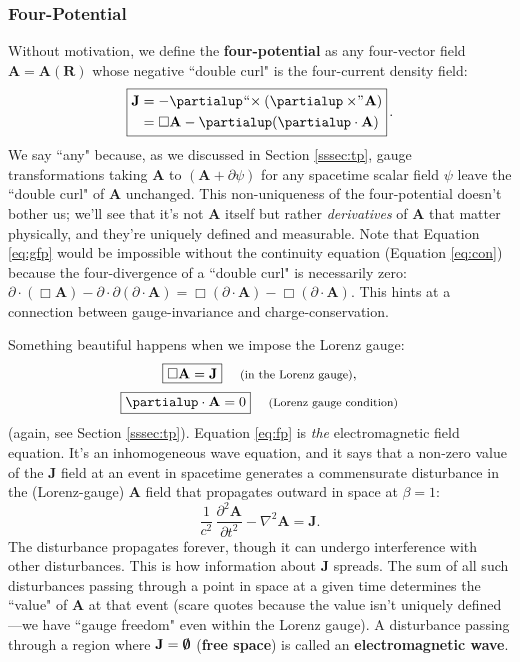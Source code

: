\documentclass[12pt]{article}
\renewcommand{\vv}[1]{\mathbf{#1}}
\begin{document}
\subsubsection{Four-Potential}\label{sssec:fp}

Without motivation, we define the \textbf{four-potential} as any four-vector field $\vv A = \vv A (\vv R)$ whose negative ``double curl" is the four-current density field:
\begin{equation}\label{eq:gfp}
\boxed{
\begin{split}
\vv J &= - \partialup \mkern1mu `` \mkern-4mu \times ( \partialup \times \mkern-4mu " \mkern1mu \vv A ) \\
&= \Box \vv A - \partialup ( \partialup \cdot \vv A)
\end{split}
} \, .
\end{equation}
We say ``any" because, as we discussed in Section \ref{sssec:tp}, gauge transformations taking $\vv A$ to $(\vv A + \partialup \psi)$ for any spacetime scalar field $\psi$ leave the ``double curl" of $\vv A$ unchanged. This non-uniqueness of the four-potential doesn't bother us; we'll see that it's not $\vv A$ itself but rather \emph{derivatives} of $\vv A$ that matter physically, and they're uniquely defined and measurable. Note that Equation \ref{eq:gfp} would be impossible without the continuity equation (Equation \ref{eq:con}) because the four-divergence of a ``double curl" is necessarily zero: ${\partialup \cdot (\Box \vv A) - \partialup \cdot \partialup (\partialup \cdot \vv A) = \Box (\partialup \cdot \vv A) - \Box (\partialup \cdot \vv A)}$. This hints at a connection between gauge-invariance and charge-conservation.

Something beautiful happens when we impose the Lorenz gauge:
\begin{equation}\label{eq:fp}
\boxed{ \Box \vv A = \vv J } \quad \textrm{\footnotesize{ (in the Lorenz gauge)}} ,
\end{equation}
\begin{equation}\label{eq:lg}
\boxed{ \partialup \cdot \vv A = 0 } \quad \textrm{\footnotesize{ (Lorenz gauge condition)}}
\end{equation}
(again, see Section \ref{sssec:tp}). Equation \ref{eq:fp} is \emph{the} electromagnetic field equation. It's an inhomogeneous wave equation, and it says that a non-zero value of the $\vv J$ field at an event in spacetime generates a commensurate disturbance in the (Lorenz-gauge) $\vv A$ field that propagates outward in space at $\beta = 1$:
\begin{equation*}
\dfrac{1}{c^2} \, \dfrac{\partial^2 \vv A}{\partial t^2} - \nabla ^2 \vv A = \vv J .
\end{equation*}
The disturbance propagates forever, though it can undergo interference with other disturbances. This is how information about $\vv J$ spreads. The sum of all such disturbances passing through a point in space at a given time determines the ``value" of $\vv A$ at that event (scare quotes because the value isn't uniquely defined---we have ``gauge freedom" even within the Lorenz gauge). A disturbance passing through a region where $\vv J = \textrm{\mbox{\boldmath $\emptyset$}}$ (\textbf{free space}) is called an \textbf{electromagnetic wave}.
\end{document}
